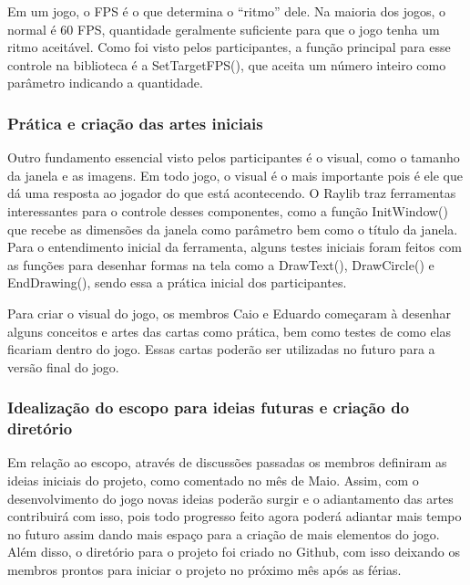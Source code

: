 Em um jogo, o FPS é o que determina o “ritmo” dele. Na maioria dos jogos, o normal é 60 FPS, quantidade geralmente suficiente para que o jogo tenha um ritmo aceitável. Como foi visto pelos participantes, a função principal para esse controle na biblioteca é a SetTargetFPS(), que aceita um número inteiro como parâmetro indicando a quantidade. 

\subsubsection{Prática e criação das artes iniciais}
Outro fundamento essencial visto pelos participantes é o visual, como o tamanho da janela e as imagens. Em todo jogo, o visual é o mais importante pois é ele que dá uma resposta ao jogador do que está acontecendo. O Raylib traz ferramentas interessantes para o controle desses componentes, como a função InitWindow() que recebe as dimensões da janela como parâmetro bem como o título da janela. Para o entendimento inicial da ferramenta, alguns testes iniciais foram feitos com as funções para desenhar formas na tela como a DrawText(), DrawCircle() e EndDrawing(), sendo essa a prática inicial dos participantes. 

Para criar o visual do jogo, os membros Caio e Eduardo começaram à desenhar alguns conceitos e artes das cartas como prática, bem como testes de como elas ficariam dentro do jogo. Essas cartas poderão ser utilizadas no futuro para a versão final do jogo. 

\subsubsection{Idealização do escopo para ideias futuras e criação do diretório}
Em relação ao escopo, através de discussões passadas os membros definiram as ideias iniciais do projeto, como comentado no mês de Maio. Assim, com o desenvolvimento do jogo novas ideias poderão surgir e o adiantamento das artes contribuirá com isso, pois todo progresso feito agora poderá adiantar mais tempo no futuro assim dando mais espaço para a criação de mais elementos do jogo. Além disso, o diretório para o projeto foi criado no Github, com isso deixando os membros prontos para iniciar o projeto no próximo mês após as férias.